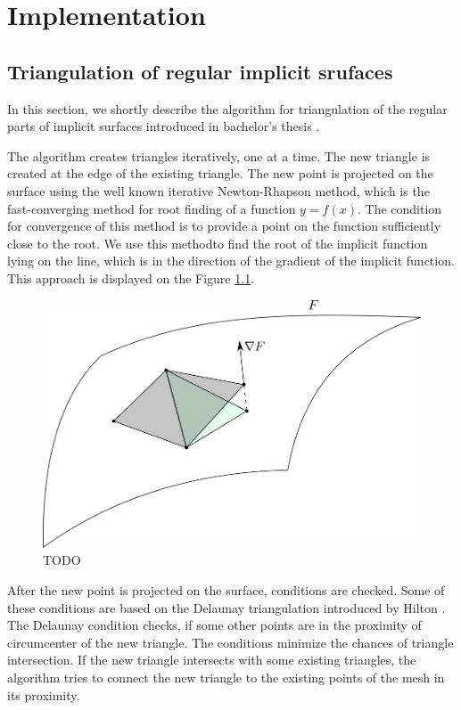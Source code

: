 \chapter{Implementation}
\label{chap3}

\section{Triangulation of regular implicit srufaces}
\label{triangulation-implicit}

In this section, we shortly describe the algorithm for triangulation of the regular
parts of implicit surfaces introduced in bachelor's thesis \cite{korecova2021triangulation}.

The algorithm creates triangles iteratively, one at a time. The new triangle is
created at the edge of the existing triangle. The new point is projected on the
surface using the well known iterative Newton-Rhapson method, which is the 
fast-converging method for root finding of a function $y=f(x)$. The condition 
for convergence of this method is to provide a point on the function sufficiently
close to the root. We use this methodto find the root of the implicit
function lying on the line, which is in the direction of the gradient of the implicit
function. This approach is displayed on the Figure \ref{img:29}.
\begin{figure}
    \centerline{\includegraphics[scale=0.5]{images/img29}}
    \caption[TODO]
    {TODO}
    \label{img:29}
\end{figure}

After the new point is projected on the surface, conditions are checked. 
Some of these conditions are based on the Delaunay triangulation introduced
by Hilton \cite{hilton1996marching}. The Delaunay condition checks,
if some other points are in the proximity of circumcenter of the new triangle.
The conditions minimize the chances of triangle intersection.
If the new triangle intersects with some existing triangles, the algorithm
tries to connect the new triangle to the existing points of the mesh in its proximity.

